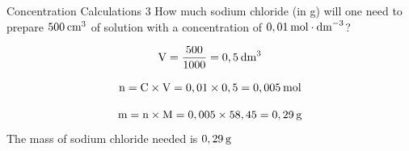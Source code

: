       \begin{wex}{Concentration Calculations 3 }
{
\label{m38712*id283476}How much sodium chloride (in g) will one need to prepare $500\phantom{\rule{2pt}{0ex}}{\text{cm}}^{3}$ of solution with a concentration of $0,01\phantom{\rule{2pt}{0ex}}\text{mol}\cdot \text{dm}^{-3}$?
      \vspace{5pt} }
{
    \begin{equation*}
    \text{V}=\frac{500}{1 000}=0,5\phantom{\rule{2pt}{0ex}}{\text{dm}}^{3}
      \end{equation*}
      \label{m38712*id283565}\nopagebreak\noindent{}
        
    \begin{equation*}
    \text{n}=\text{C}\ensuremath{\times}\text{V}=0,01\ensuremath{\times}0,5=0,005\phantom{\rule{2pt}{0ex}}\text{mol}
      \end{equation*}
      \label{m38712*id283636}\nopagebreak\noindent{}
        
    \begin{equation*}
    \text{m}=\text{n}\ensuremath{\times}\text{M}=0,005\ensuremath{\times}58,45=0,29\phantom{\rule{2pt}{0ex}}\text{g}
      \end{equation*}
      \label{m38712*id283684}The mass of sodium chloride needed is $0,29\phantom{\rule{2pt}{0ex}}\text{g}$
 
}
    \end{wex}
    \noindent
\label{m38712*secfhsst!!!underscore!!!id1879}
